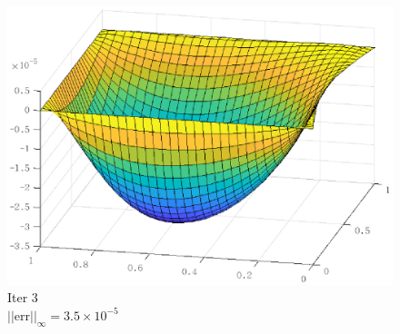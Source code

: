 \documentclass[lang=cn,10pt]{elegantbook}
\begin{document}
\begin{figure}[H]
\begin{minipage}[t]{0.22\linewidth}
    \includegraphics[width=0.9\linewidth]{figure/3-5-6.eps}
    \caption*{\small Iter 3 \\ $||\text{err}||_\infty=3.5\times 10^{-5}$}
  \end{minipage}
\end{figure}
\end{document}
